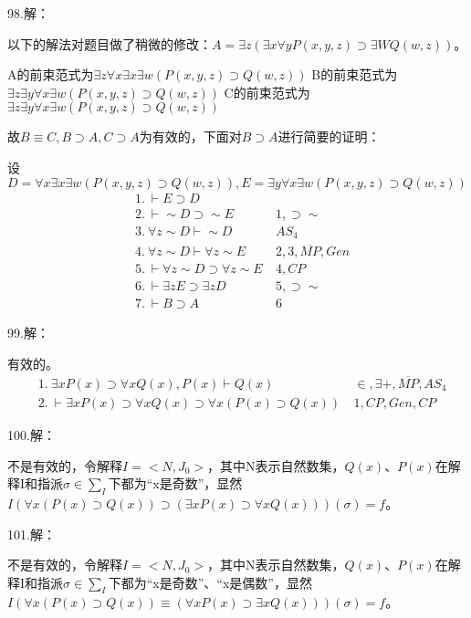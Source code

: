 \documentclass[a4paper]{ctexart}
\begin{document}
\noindent 98.解：

以下的解法对题目做了稍微的修改：$A=\exists{z}(\exists{x}\forall{y}P(x,y,z)\supset\exists{W}Q(w,z))$。

\noindent A的前束范式为$\exists{z}\forall{x}\exists{x}\exists{w}(P(x,y,z)\supset Q(w,z))$\newline
B的前束范式为$\exists{z}\exists{y}\forall{x}\exists{w}(P(x,y,z)\supset Q(w,z))$\newline
C的前束范式为$\exists{z}\exists{y}\forall{x}\exists{w}(P(x,y,z)\supset Q(w,z))$\newline

故$B\equiv C,B\supset A,C\supset A$为有效的，下面对$B\supset A$进行简要的证明：

设$D=\forall{x}\exists{x}\exists{w}(P(x,y,z)\supset Q(w,z)),E=\exists{y}\forall{x}\exists{w}(P(x,y,z)\supset Q(w,z))$
\begin{align*}
  &1. \ \vdash E\supset D \\
  &2. \ \vdash \sim D\supset \sim E \ &1,\supset\sim \\
  &3. \ \forall{z}\sim D\vdash \sim D \ &AS_4 \\
  &4. \ \forall{z}\sim D\vdash \forall{z}\sim E \ &2,3,\overline{MP},Gen\\
  &5. \ \vdash \forall{z}\sim D\supset \forall{z}\sim E \ &4,CP\\
  &6. \ \vdash \exists{z}E\supset \exists{z}D \ &5,\supset\sim \\
  &7. \ \vdash B\supset A \ &6
\end{align*}

\noindent 99.解：

有效的。
\begin{align*}
  &1. \ \exists{x}P(x)\supset \forall{x}Q(x),P(x)\vdash Q(x) \ &\in,\exists+,\overline{MP},AS_4 \\
  &2. \ \vdash \exists{x}P(x)\supset \forall{x}Q(x)\supset \forall{x}(P(x)\supset Q(x)) \ &1,CP,Gen,CP
\end{align*}

\noindent 100.解：

不是有效的，令解释$I=<N,J_0>$，其中N表示自然数集，$Q(x)\text{、}P(x)$在解释I和指派$\sigma\in\sum_I$下都为“x是奇数”，显然$I(\forall{x}(P(x)\supset Q(x))\supset(\exists{x}P(x)\supset\forall{x}Q(x)))(\sigma)=f$。\newline

\noindent 101.解：

不是有效的，令解释$I=<N,J_0>$，其中N表示自然数集，$Q(x)\text{、}P(x)$在解释I和指派$\sigma\in\sum_I$下都为“x是奇数”、“x是偶数”，显然$I(\forall{x}(P(x)\supset Q(x))\equiv(\forall{x}P(x)\supset\exists{x}Q(x)))(\sigma)=f$。\newline
\end{document}
